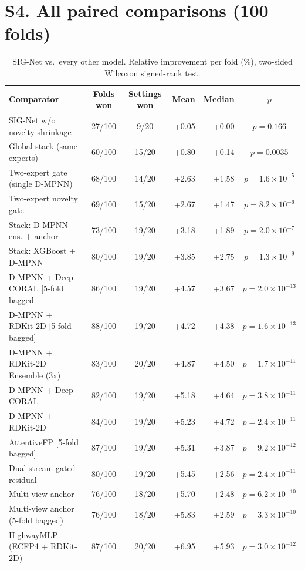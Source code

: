 \documentclass[11pt]{article}
\begin{document}
\section*{S4. All paired comparisons (100 folds)}
{\small\setlength{\tabcolsep}{4pt}
\begin{longtable}{lccrrc}
\caption{SIG-Net vs.\ every other model. Relative improvement per fold (\%), two-sided Wilcoxon signed-rank test.}\\
\toprule
Comparator & Folds won & Settings won & Mean & Median & $p$ \\
\midrule
SIG-Net w/o novelty shrinkage & 27/100 & 9/20 & +0.05 & +0.00 & $p = 0.166$ \\
Global stack (same experts) & 60/100 & 15/20 & +0.80 & +0.14 & $p = 0.0035$ \\
Two-expert gate (single D-MPNN) & 68/100 & 14/20 & +2.63 & +1.58 & $p = 1.6 \times 10^{-5}$ \\
Two-expert novelty gate & 69/100 & 15/20 & +2.67 & +1.47 & $p = 8.2 \times 10^{-6}$ \\
Stack: D-MPNN ens. + anchor & 73/100 & 19/20 & +3.18 & +1.89 & $p = 2.0 \times 10^{-7}$ \\
Stack: XGBoost + D-MPNN & 80/100 & 19/20 & +3.85 & +2.75 & $p = 1.3 \times 10^{-9}$ \\
D-MPNN + Deep CORAL [5-fold bagged] & 86/100 & 19/20 & +4.57 & +3.67 & $p = 2.0 \times 10^{-13}$ \\
D-MPNN + RDKit-2D [5-fold bagged] & 88/100 & 19/20 & +4.72 & +4.38 & $p = 1.6 \times 10^{-13}$ \\
D-MPNN + RDKit-2D Ensemble (3x) & 83/100 & 20/20 & +4.87 & +4.50 & $p = 1.7 \times 10^{-11}$ \\
D-MPNN + Deep CORAL & 82/100 & 19/20 & +5.18 & +4.64 & $p = 3.8 \times 10^{-11}$ \\
D-MPNN + RDKit-2D & 84/100 & 19/20 & +5.23 & +4.72 & $p = 2.4 \times 10^{-11}$ \\
AttentiveFP [5-fold bagged] & 87/100 & 19/20 & +5.31 & +3.87 & $p = 9.2 \times 10^{-12}$ \\
Dual-stream gated residual & 80/100 & 19/20 & +5.45 & +2.56 & $p = 2.4 \times 10^{-11}$ \\
Multi-view anchor & 76/100 & 18/20 & +5.70 & +2.48 & $p = 6.2 \times 10^{-10}$ \\
Multi-view anchor (5-fold bagged) & 76/100 & 18/20 & +5.83 & +2.59 & $p = 3.3 \times 10^{-10}$ \\
HighwayMLP (ECFP4 + RDKit-2D) & 87/100 & 20/20 & +6.95 & +5.93 & $p = 3.0 \times 10^{-12}$ \\

\end{longtable}}
\end{document}
